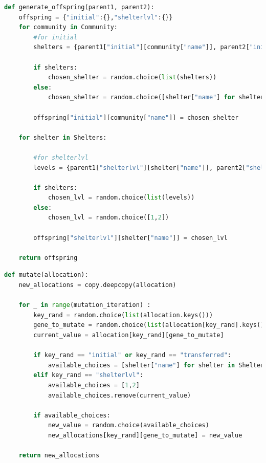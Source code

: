 \begin{appendices}
\begin{centerappendixtitle}
\begin{lstlisting}[language=Python,caption={Genetic Algorithm - Crossover}, label={crossoverCode}]
def generate_offspring(parent1, parent2):
    offspring = {"initial":{},"shelterlvl":{}}
    for community in Community:
        #for initial
        shelters = {parent1["initial"][community["name"]], parent2["initial"][community["name"]]} 
        
        if shelters:
            chosen_shelter = random.choice(list(shelters))
        else:
            chosen_shelter = random.choice([shelter["name"] for shelter in Shelters])

        offspring["initial"][community["name"]] = chosen_shelter

    for shelter in Shelters:

        #for shelterlvl
        levels = {parent1["shelterlvl"][shelter["name"]], parent2["shelterlvl"][shelter["name"]]} 
        
        if shelters:
            chosen_lvl = random.choice(list(levels))
        else:
            chosen_lvl = random.choice([1,2])

        offspring["shelterlvl"][shelter["name"]] = chosen_lvl

    return offspring
\end{lstlisting}

\pagebreak
\begin{lstlisting}[language=Python,caption={Genetic Algorithm - Mutation}, label={mutationCode}]
def mutate(allocation):
    new_allocations = copy.deepcopy(allocation)

    for _ in range(mutation_iteration) : 
        key_rand = random.choice(list(allocation.keys()))
        gene_to_mutate = random.choice(list(allocation[key_rand].keys()))
        current_value = allocation[key_rand][gene_to_mutate]
        
        if key_rand == "initial" or key_rand == "transferred":
            available_choices = [shelter["name"] for shelter in Shelters if shelter["name"] != current_value]
        elif key_rand == "shelterlvl":
            available_choices = [1,2]
            available_choices.remove(current_value)

        if available_choices:
            new_value = random.choice(available_choices)
            new_allocations[key_rand][gene_to_mutate] = new_value
            
    return new_allocations
\end{lstlisting}


\end{centerappendixtitle}
\end{appendices}
